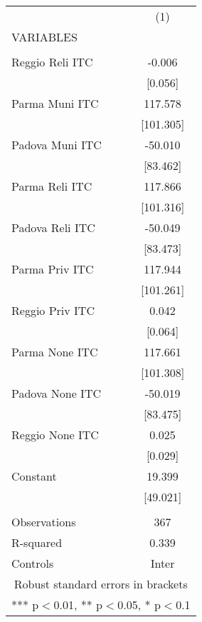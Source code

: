 \begin{tabular}{lc} \hline
 & (1) \\
VARIABLES &  \\ \hline
 &  \\
Reggio Reli ITC & -0.006 \\
 & [0.056] \\
Parma Muni ITC & 117.578 \\
 & [101.305] \\
Padova Muni ITC & -50.010 \\
 & [83.462] \\
Parma Reli ITC & 117.866 \\
 & [101.316] \\
Padova Reli ITC & -50.049 \\
 & [83.473] \\
Parma Priv ITC & 117.944 \\
 & [101.261] \\
Reggio Priv ITC & 0.042 \\
 & [0.064] \\
Parma None ITC & 117.661 \\
 & [101.308] \\
Padova None ITC & -50.019 \\
 & [83.475] \\
Reggio None ITC & 0.025 \\
 & [0.029] \\
Constant & 19.399 \\
 & [49.021] \\
 &  \\
Observations & 367 \\
R-squared & 0.339 \\
 Controls & Inter \\ \hline
\multicolumn{2}{c}{ Robust standard errors in brackets} \\
\multicolumn{2}{c}{ *** p$<$0.01, ** p$<$0.05, * p$<$0.1} \\
\end{tabular}
